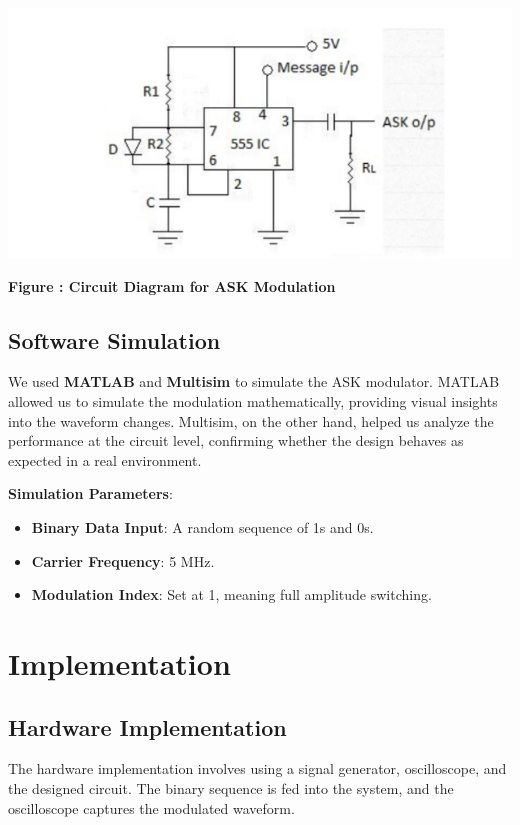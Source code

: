 \documentclass[12pt,a4paper]{article}
\begin{document}
\begin{center}
    {\includegraphics[width=550px, height=250px]{ckt.png}}
    \parbox{0.8\textwidth}{ 
        \centering
        \textbf{Figure : Circuit Diagram for ASK Modulation}
    }
\end{center}

\subsection*{Software Simulation}
We used \textbf{MATLAB} and \textbf{Multisim} to simulate the ASK modulator. MATLAB allowed us to simulate the modulation mathematically, providing visual insights into the waveform changes. Multisim, on the other hand, helped us analyze the performance at the circuit level, confirming whether the design behaves as expected in a real environment.

\textbf{Simulation Parameters}:
\begin{itemize}
    \item \textbf{Binary Data Input}: A random sequence of 1s and 0s.
    \item \textbf{Carrier Frequency}: 5 MHz.
    \item \textbf{Modulation Index}: Set at 1, meaning full amplitude switching.
\end{itemize}

\section*{Implementation}
\subsection*{Hardware Implementation}
The hardware implementation involves using a signal generator, oscilloscope, and the designed circuit. The binary sequence is fed into the system, and the oscilloscope captures the modulated waveform.
\end{document}
